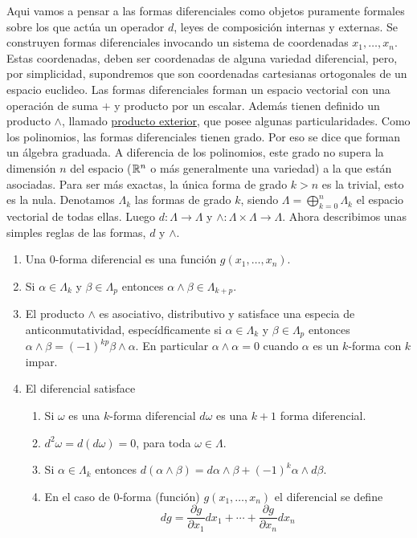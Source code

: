 \begin{subappendices}
Aqui vamos a pensar a las formas diferenciales como objetos puramente formales sobre los que actúa un operador $d$, leyes de composición internas y externas. Se construyen formas diferenciales invocando un sistema de coordenadas $x_1,\ldots,x_n$. Estas coordenadas, deben ser coordenadas de alguna variedad diferencial, pero, por simplicidad, supondremos que son coordenadas cartesianas ortogonales de un espacio euclideo. Las formas diferenciales forman un espacio vectorial con una operación de suma $+$ y producto por un escalar. Además tienen definido un producto $\wedge$, llamado \href{https://es.wikipedia.org/wiki/Producto_exterior}{producto exterior}\link, que posee  algunas particularidades.  Como los polinomios, las formas diferenciales tienen grado. Por eso se dice que forman un álgebra graduada. A diferencia de los polinomios, este grado no supera la dimensión $n$ del espacio ($\mathbb{R}^n$ o más generalmente una variedad) a la que están asociadas. Para ser más exactas, la única forma 
de 
grado $k>n$ es la trivial, esto es la nula. Denotamos $\Lambda_k$ las formas de grado $k$, siendo $\Lambda =\bigoplus_{k=0}^{n}\Lambda_k$ el espacio vectorial de todas ellas. Luego $d:\Lambda\to\Lambda$ y $\wedge:\Lambda\times\Lambda\to \Lambda$. Ahora describimos unas simples reglas de las formas,  $d$ y $\wedge$.



\begin{enumerate}
   \item Una 0-forma diferencial es una función $g(x_1,\ldots,x_n)$.

  \item Si $\alpha\in\Lambda_k$ y $\beta\in\Lambda_p$ entonces $\alpha \wedge \beta\in \Lambda_{k+p}$.
  \item El producto $\wedge$ es asociativo, distributivo y satisface una especia de anticonmutatividad, especídficamente si $\alpha\in\Lambda_k$ y $\beta\in\Lambda_p$ entonces $\alpha\wedge \beta=(-1)^{kp}\beta\wedge\alpha$. En particular $\alpha\wedge\alpha=0$ cuando $\alpha$ es un $k$-forma con $k$ impar.
  \item El diferencial satisface
  \begin{enumerate}
    \item Si $\omega$ es una $k$-forma diferencial $d\omega$ es una $k+1$ forma diferencial.
    \item  $d^2\omega=d(d\omega)=0$, para toda $\omega\in\Lambda$.
    \item Si $\alpha\in\Lambda_k$ entonces  $d(\alpha\wedge\beta)=d\alpha\wedge\beta+(-1)^k\alpha\wedge d\beta$.
    \item En el caso de $0$-forma (función) $g(x_1,\ldots,x_n)$ el diferencial se define
    \[dg=\frac{\partial g}{\partial x_1}dx_1+\cdots+\frac{\partial g}{\partial x_n}dx_n\]


\end{enumerate}
\end{enumerate}
\end{subappendices}
